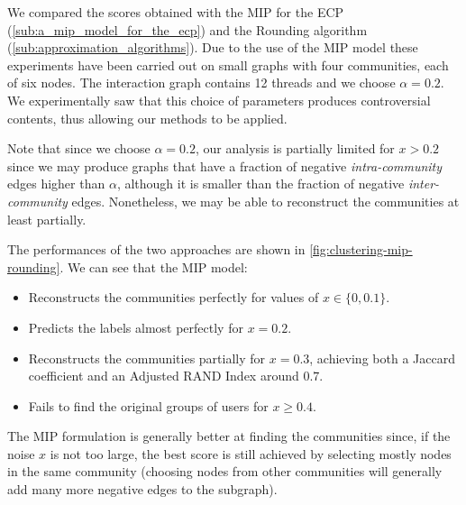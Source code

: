 We compared the scores obtained with the \acrshort{MIP} for the \acrshort{ECP}
(\autoref{sub:a_mip_model_for_the_ecp}) and the Rounding algorithm
(\autoref{sub:approximation_algorithms}). Due to the use of the
\acrshort{MIP} model these experiments have been carried out on
small graphs with four communities, each of six nodes. The interaction graph
contains 12 threads and we choose $\alpha = 0.2$. We experimentally saw that
this choice of parameters produces controversial contents, thus allowing our
methods to be applied.

Note that since we choose $\alpha = 0.2$, our analysis is partially limited for
$x > 0.2$ since we may produce graphs that have a fraction of negative
\emph{intra-community} edges higher than $\alpha $, although it is smaller than
the fraction of negative \emph{inter-community} edges. Nonetheless, we may be
able to reconstruct the communities at least partially.

The performances of the two approaches are shown in
\autoref{fig:clustering-mip-rounding}. We can see that the MIP model:
\begin{itemize}
	\item Reconstructs the communities perfectly for values of $x \in \{0,
		      0.1\}$.
	\item Predicts the labels almost perfectly for $x= 0.2$.
	\item Reconstructs the communities partially for $x = 0.3$, achieving both
	      a Jaccard coefficient and an Adjusted RAND Index around $0.7$.
	\item Fails to find the original groups of users for $x \geq 0.4$.
\end{itemize}

The MIP formulation is generally better at finding the communities since, if
the noise $x$ is not too large, the best score is still achieved
by selecting mostly nodes in the same community (choosing nodes from other
communities will generally add many more negative edges to the subgraph).

